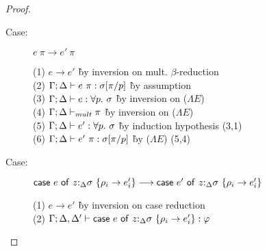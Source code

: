 \begin{proof}
\begin{description}
\item[Case:] $e~\pi \longrightarrow e'~\pi$
\begin{tabbing}
(1) $e \longrightarrow e'$ \` by inversion on mult. $\beta$-reduction \\
(2) $\Gamma; \Delta \vdash e~\pi : \sigma[\pi/p]$ \` by assumption \\
(3) $\Gamma; \Delta \vdash e : \forall p.~\sigma$ \` by inversion on ($\Lambda E$) \\
(4) $\Gamma; \Delta \vdash_{mult} \pi$ \` by inversion on ($\Lambda E$) \\
(5) $\Gamma; \Delta \vdash e' : \forall p.~\sigma$ \` by induction hypothesis (3,1) \\
(6) $\Gamma; \Delta \vdash e'~\pi : \sigma[\pi/p]$ \` by ($\Lambda E$) (5,4) \\
\end{tabbing}

\item[Case:] $\mathsf{case}~e~\mathsf{of}~z{:}_{\Delta}\sigma~\{\rho_i\to e'_i\} \longrightarrow \mathsf{case}~e'~\mathsf{of}~z{:}_{\Delta}\sigma~\{\rho_i\to e'_i\}$
\begin{tabbing}
    (1) $e \longrightarrow e'$ \` by inversion on case reduction \\
    (2) $\Gamma; \Delta, \Delta' \vdash \mathsf{case}~e~\mathsf{of}~z{:}_{\Delta}\sigma~\{\rho_i\to e'_i\} : \varphi$\\
\end{tabbing}

\end{description}

\end{proof}

